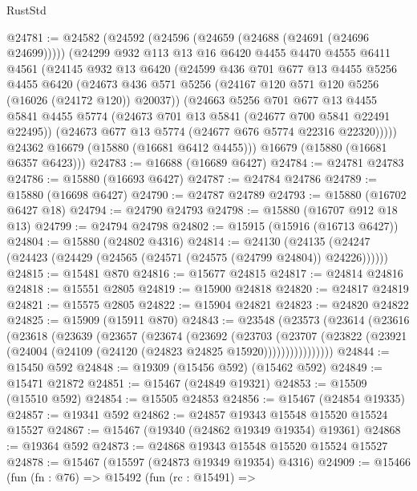 \begin{lexlean}{RustStd}
\begin{coremodule}
@24781 := @24582
    (@24592
      (@24596 (@24659 (@24688 (@24691 (@24696 @24699)))))
      (@24299
        @932
        @113
        @13
        @16
        @6420
        @4455
        @4470
        @4555
        @6411
        @4561
        (@24145
          @932
          @13
          @6420
          (@24599
            @436
            @701
            @677
            @13
            @4455
            @5256
            @4455
            @6420
            (@24673 @436 @571 @5256 (@24167 @120 @571 @120 @5256 (@16026 (@24172 @120)) @20037))
            (@24663
              @5256
              @701
              @677
              @13
              @4455
              @5841
              @4455
              @5774
              (@24673 @701 @13 @5841 (@24677 @700 @5841 @22491 @22495))
              (@24673 @677 @13 @5774 (@24677 @676 @5774 @22316 @22320)))))
        @24362
        @16679
        (@15880 (@16681 @6412 @4455)))
      @16679
      (@15880 (@16681 @6357 @6423)))
@24783 := @16688 (@16689 @6427)
@24784 := @24781 @24783
@24786 := @15880 (@16693 @6427)
@24787 := @24784 @24786
@24789 := @15880 (@16698 @6427)
@24790 := @24787 @24789
@24793 := @15880 (@16702 @6427 @18)
@24794 := @24790 @24793
@24798 := @15880 (@16707 @912 @18 @13)
@24799 := @24794 @24798
@24802 := @15915 (@15916 (@16713 @6427))
@24804 := @15880 (@24802 @4316)
@24814 := @24130
    (@24135 (@24247 (@24423 (@24429 (@24565 (@24571 (@24575 (@24799 @24804)) @24226))))))
@24815 := @15481 @870
@24816 := @15677 @24815
@24817 := @24814 @24816
@24818 := @15551 @2805
@24819 := @15900 @24818
@24820 := @24817 @24819
@24821 := @15575 @2805
@24822 := @15904 @24821
@24823 := @24820 @24822
@24825 := @15909 (@15911 @870)
@24843 := @23548
    (@23573
      (@23614
        (@23616
          (@23618
            (@23639
              (@23657
                (@23674
                  (@23692
                    (@23703
                      (@23707
                        (@23822
                          (@23921 (@24004 (@24109 (@24120 (@24823 @24825 @15920))))))))))))))))
@24844 := @15450 @592
@24848 := @19309 (@15456 @592) (@15462 @592)
@24849 := @15471 @21872
@24851 := @15467 (@24849 @19321)
@24853 := @15509 (@15510 @592)
@24854 := @15505 @24853
@24856 := @15467 (@24854 @19335)
@24857 := @19341 @592
@24862 := @24857 @19343 @15548 @15520 @15524 @15527
@24867 := @15467 (@19340 (@24862 @19349 @19354) @19361)
@24868 := @19364 @592
@24873 := @24868 @19343 @15548 @15520 @15524 @15527
@24878 := @15467 (@15597 (@24873 @19349 @19354) @4316)
@24909 := @15466
    (fun (fn : @76) =>
    @15492
      (fun (rc : @15491) =>

\end{coremodule}
\end{lexlean}
